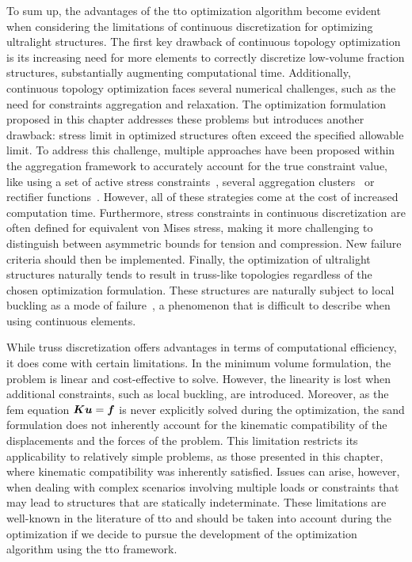 To sum up, the advantages of the \gls{tto} optimization algorithm become evident when considering the limitations of continuous discretization for optimizing ultralight structures. The first key drawback of continuous topology optimization is its increasing need for more elements to correctly discretize low-volume fraction structures, substantially augmenting computational time. Additionally, continuous topology optimization faces several numerical challenges, such as the need for constraints aggregation and relaxation. The optimization formulation proposed in this chapter addresses these problems but introduces another drawback: stress limit in optimized structures often exceed the specified allowable limit. To address this challenge, multiple approaches have been proposed within the aggregation framework to accurately account for the true constraint value, like using a set of active stress constraints~, several aggregation clusters~ or rectifier functions~. However, all of these strategies come at the cost of increased computation time. Furthermore, stress constraints in continuous discretization are often defined for equivalent von Mises stress, making it more challenging to distinguish between asymmetric bounds for tension and compression. New failure criteria should then be implemented. Finally, the optimization of ultralight structures naturally tends to result in truss-like topologies regardless of the chosen optimization formulation. These structures are naturally subject to local buckling as a mode of failure~, a phenomenon that is difficult to describe when using continuous elements.

While truss discretization offers advantages in terms of computational efficiency, it does come with certain limitations. In the minimum volume formulation, the problem is linear and cost-effective to solve. However, the linearity is lost when additional constraints, such as local buckling, are introduced. Moreover, as the \gls{fem} equation $\bm{K}\bm{u}=\bm{f}$ is never explicitly solved during the optimization, the \gls{sand} formulation does not inherently account for the kinematic compatibility of the displacements and the forces of the problem. This limitation restricts its applicability to relatively simple problems, as those presented in this chapter, where kinematic compatibility was inherently satisfied. Issues can arise, however, when dealing with complex scenarios involving multiple loads or constraints that may lead to structures that are statically indeterminate. These limitations are well-known in the literature of \gls{tto} and should be taken into account during the optimization if we decide to pursue the development of the optimization algorithm using the \gls{tto} framework.

